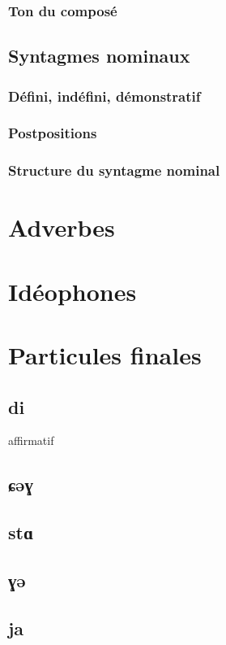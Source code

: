 \documentclass[11pt, a4paper]{book}              %
\newcommand{\ipa}[1]{{\phon \mbox{#1}}} %
\begin{document}
\subsection{Ton du composé}
\section{Syntagmes nominaux}
\subsection{Défini, indéfini, démonstratif}
\subsection{Postpositions}



\subsection{Structure du syntagme nominal}
\chapter{Adverbes}
\chapter{Idéophones}
\chapter{Particules finales}

\section{\ipa{di}}

affirmatif

\section{\ipa{ɕəɣ}}

\section{\ipa{stɑ}}

\section{\ipa{ɣə}}

\section{\ipa{ja}}
\end{document}
